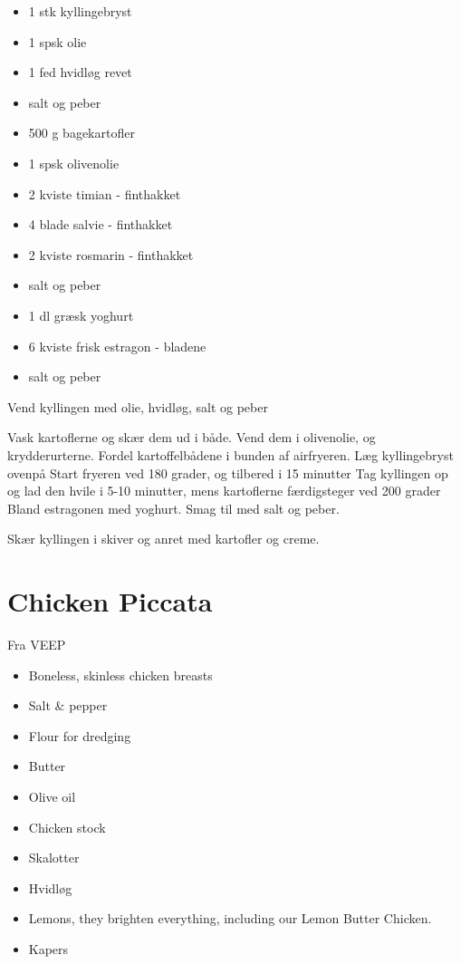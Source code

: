 \documentclass[
  letterpaper,
  DIV=11,
  numbers=noendperiod]{scrreprt}
\providecommand{\tightlist}{%
  \setlength{\itemsep}{0pt}\setlength{\parskip}{0pt}}\usepackage{longtable,booktabs,array}
\begin{document}
\begin{itemize}
\item
  1 stk kyllingebryst
\item
  1 spsk olie
\item
  1 fed hvidløg revet
\item
  salt og peber
\item
  500 g bagekartofler
\item
  1 spsk olivenolie
\item
  2 kviste timian - finthakket
\item
  4 blade salvie - finthakket
\item
  2 kviste rosmarin - finthakket
\item
  salt og peber
\item
  1 dl græsk yoghurt
\item
  6 kviste frisk estragon - bladene
\item
  salt og peber
\end{itemize}

Vend kyllingen med olie, hvidløg, salt og peber

Vask kartoflerne og skær dem ud i både. Vend dem i olivenolie, og
krydderurterne. Fordel kartoffelbådene i bunden af airfryeren. Læg
kyllingebryst ovenpå Start fryeren ved 180 grader, og tilbered i 15
minutter Tag kyllingen op og lad den hvile i 5-10 minutter, mens
kartoflerne færdigsteger ved 200 grader Bland estragonen med yoghurt.
Smag til med salt og peber.

Skær kyllingen i skiver og anret med kartofler og creme.

\hypertarget{chicken-piccata}{%
\section{Chicken Piccata}\label{chicken-piccata}}

Fra VEEP

\begin{itemize}
\tightlist
\item
  Boneless, skinless chicken breasts
\item
  Salt \& pepper
\item
  Flour for dredging
\item
  Butter
\item
  Olive oil
\item
  Chicken stock
\item
  Skalotter
\item
  Hvidløg
\item
  Lemons, they brighten everything, including our Lemon Butter Chicken.
\item
  Kapers
\end{itemize}
\end{document}
